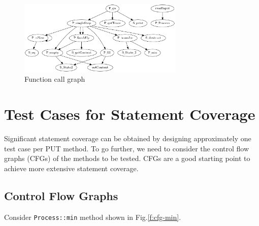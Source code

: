 \documentclass[12pts]{report}
\begin{document}
\begin{figure}
\begin{center}
\includegraphics[width=0.7\textwidth]{images/dep.png}
\end{center}
\caption{Function call graph}
\label{f:fcg}
\end{figure}

\section{Test Cases for Statement Coverage}
Significant statement coverage can be obtained by designing approximately one test case per PUT method. To go further, we need to consider the control flow graphs (CFGs) of the methods to be tested. CFGs are a good starting point to achieve more extensive statement coverage.

\subsection{Control Flow Graphs}
Consider \lstinline[style=jc]|Process::min| method shown in Fig.\ref{f:cfg-min}.
\end{document}
